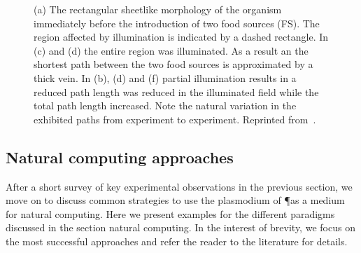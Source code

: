			\begin{figure}[htp]
				\centering
				\newline
				\newline

				\caption[Classic maze experiment with \P]{(a)  The  rectangular  sheetlike  morphology  of  the organism  immediately  before  the  introduction  of  two  food sources (FS). The region affected by illumination is indicated by a dashed rectangle. In (c) and (d) the entire region was illuminated. As a result an the shortest path between the two food sources is approximated by a thick vein. In (b), (d) and (f) partial illumination results in a reduced path length was reduced in the illuminated field while the total path length increased. Note the natural variation in the exhibited paths from experiment to experiment.  Reprinted from~\cite{PhysRevLett.99.068104}.}
				\label{fig:snell}
			\end{figure}

			\FloatBarrier

	\subsection{Natural computing approaches}

		After a short survey of key experimental observations in the previous section, we move on to discuss common strategies to use the plasmodium of \P as a medium for natural computing. Here we present examples for the different paradigms discussed in the section natural computing. In the interest of brevity, we focus on the most successful approaches and refer the reader to the literature for details.

